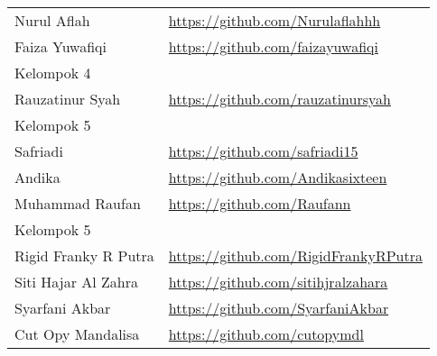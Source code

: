 \documentclass[a4paper]{tufte-handout}
\begin{document}
\begin{projects}
\begin{description}
\begin{table}[!ht]
\begin{tabular}{ll}
Nurul Aflah				& \url{https://github.com/Nurulaflahhh} \\
Faiza Yuwafiqi			& \url{https://github.com/faizayuwafiqi} \\
\midrule
Kelompok 4\\
\midrule
Rauzatinur Syah			& \url{https://github.com/rauzatinursyah} \\
\midrule
Kelompok 5\\
\midrule
Safriadi         		& \url{https://github.com/safriadi15} \\
Andika				& \url{https://github.com/Andikasixteen} \\
Muhammad Raufan			& \url{https://github.com/Raufann} \\
\midrule
Kelompok 5\\
\midrule
Rigid Franky R Putra	& \url{https://github.com/RigidFrankyRPutra} \\
Siti Hajar Al Zahra		& \url{https://github.com/sitihjralzahara} \\
Syarfani Akbar			& \url{https://github.com/SyarfaniAkbar} \\
Cut Opy Mandalisa		& \url{https://github.com/cutopymdl} \\
\midrule
\end{tabular}
\end{table}
\end{description}
\end{projects}
\end{document}
